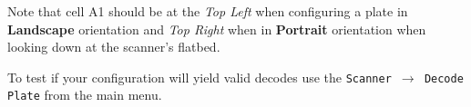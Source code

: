 Note that cell A1 should be at the \emph{Top Left} when configuring a plate in
\textbf{Landscape} orientation and \emph{Top Right} when in \textbf{Portrait}
orientation when looking down at the scanner's flatbed.

To test if your configuration will yield valid decodes use the
\texttt{Scanner $\to$ Decode Plate} from the main menu.

